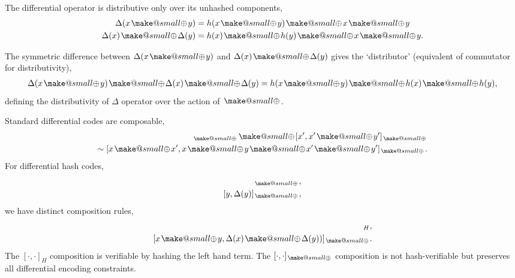 \documentclass[twocolumn, aps, amsmath, amssymb, nofootinbib, superscriptaddress, longbibliography, doublefloatfix, table-of-contents, eqsecnum, rmp]{revtex4-2}
\makeatletter
\newcommand{\soplus}{{{\hspace{1pt}}{\mathbin{\mathpalette\make@small\oplus}}}{\hspace{1pt}}}
\newcommand{\make@small}[2]{%
  \vcenter{\hbox{%
    \scalebox{0.6}{$\m@th#1#2$}%
  }}%
}
\makeatother
\begin{document}
The differential operator is distributive only over its unhashed components,
\begin{align}
	\Delta(x\soplus y) &= h(x\soplus y)\soplus x\soplus y \nonumber\\
	\Delta(x)\soplus\Delta(y) &= h(x)\soplus h(y)\soplus x\soplus y.
\end{align}





The symmetric difference between $\Delta(x\soplus y)$ and $\Delta(x)\soplus\Delta(y)$ gives the `distributor' (equivalent of commutator for distributivity),
\begin{align}
	\Delta(x\soplus y)\soplus \Delta(x)\soplus \Delta(y) = h(x\soplus y) \soplus h(x)\soplus h(y),
\end{align}
defining the distributivity of $\Delta$ operator over the action of $\soplus$.

Standard differential codes are composable,
\begin{align}
	[x,x\soplus y)]_\soplus \soplus [x',x'\soplus y']_\soplus\nonumber\\
	\sim [x\soplus x', x\soplus y \soplus x' \soplus y']_\soplus.
\end{align}
For differential hash codes,
\begin{align}
	[x,\Delta(x)]_\soplus,\nonumber\\
	[y,\Delta(y)]_\soplus,
\end{align}
we have distinct composition rules,
\begin{align}
	[x\soplus y,\Delta(x\soplus y)]_H,\nonumber\\
	[x\soplus y,\Delta(x) \soplus \Delta(y))]_\soplus.
\end{align}
The $[\cdot,\cdot]_H$ composition is verifiable by hashing the left hand term. The $[\cdot,\cdot]_\soplus$ composition is not hash-verifiable but preserves all differential encoding constraints.
\end{document}
